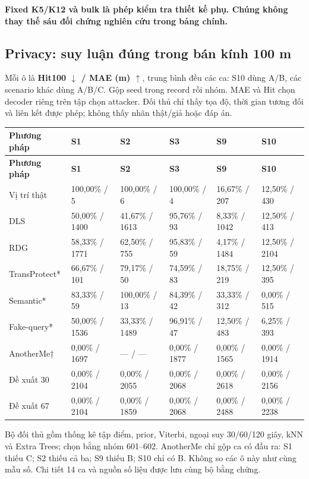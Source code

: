 \documentclass[10pt,a4paper]{article}
\newcommand{\key}[1]{\par\smallskip\noindent\colorbox{pale}{\parbox{\dimexpr\linewidth-2\fboxsep}{\textbf{#1}}}\par\smallskip}
\begin{document}
\key{Fixed K5/K12 và bulk là phép kiểm tra thiết kế phụ. Chúng không thay thế sáu đối chứng nghiên cứu trong bảng chính.}


\clearpage
\subsection{Privacy: suy luận đúng trong bán kính 100 m}
Mỗi ô là \textbf{Hit100 $\downarrow$ / MAE (m) $\uparrow$}, trung bình đều các ca: S10 dùng A/B, các scenario khác dùng A/B/C. Gộp seed trong record rồi nhóm. MAE và Hit chọn decoder riêng trên tập chọn attacker. Đối thủ chỉ thấy tọa độ, thời gian tương đối và liên kết được phép; không thấy nhãn thật/giả hoặc đáp án.

\begingroup\small
\begin{longtable}{@{}P{3.469cm}P{2.465cm}P{2.465cm}P{2.465cm}P{2.465cm}P{2.465cm}@{}}
\toprule
\textbf{Phương pháp} & \textbf{S1} & \textbf{S2} & \textbf{S3} & \textbf{S9} & \textbf{S10}\\\midrule
\endfirsthead
\toprule
\textbf{Phương pháp} & \textbf{S1} & \textbf{S2} & \textbf{S3} & \textbf{S9} & \textbf{S10}\\\midrule
\endhead
\bottomrule\endfoot
Vị trí thật & 100,00\% / 5 & 100,00\% / 6 & 100,00\% / 4 & 16,67\% / 207 & 12,50\% / 430\\
\addlinespace[3pt]
DLS & 50,00\% / 1400 & 41,67\% / 1613 & 95,76\% / 93 & 8,33\% / 1042 & 12,50\% / 413\\
\addlinespace[3pt]
RDG & 58,33\% / 1771 & 62,50\% / 755 & 95,83\% / 59 & 4,17\% / 1484 & 12,50\% / 2104\\
\addlinespace[3pt]
TransProtect* & 66,67\% / 101 & 79,17\% / 50 & 74,59\% / 83 & 18,75\% / 219 & 12,50\% / 395\\
\addlinespace[3pt]
Semantic* & 83,33\% / 59 & 100,00\% / 13 & 84,39\% / 42 & 33,33\% / 312 & 0,00\% / 515\\
\addlinespace[3pt]
Fake-query* & 50,00\% / 1536 & 33,33\% / 1489 & 96,91\% / 47 & 12,50\% / 483 & 6,25\% / 393\\
\addlinespace[3pt]
AnotherMe† & 0,00\% / 1697 & — / — & 0,00\% / 1877 & 0,00\% / 1565 & 0,00\% / 1914\\
\addlinespace[3pt]
Đề xuất 30 & 0,00\% / 2104 & 0,00\% / 2055 & 0,00\% / 2068 & 0,00\% / 2618 & 0,00\% / 2156\\
\addlinespace[3pt]
Đề xuất 67 & 0,00\% / 2104 & 0,00\% / 1859 & 0,00\% / 2068 & 0,00\% / 2488 & 0,00\% / 2238\\
\end{longtable}
\endgroup
Bộ đối thủ gồm thống kê tập điểm, prior, Viterbi, ngoại suy 30/60/120 giây, kNN và Extra Trees; chọn bằng nhóm 601–602. AnotherMe chỉ gộp ca có đầu ra: S1 thiếu C; S2 thiếu cả ba; S9 thiếu B; S10 chỉ có B. Không so các ô này như cùng mẫu số. Chi tiết 14 ca và nguồn số liệu được lưu cùng bộ bằng chứng.
\end{document}

